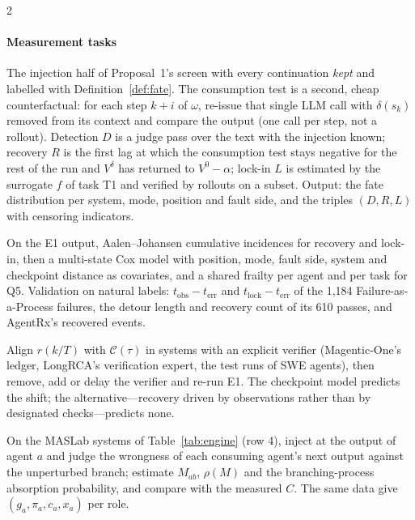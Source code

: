 \begin{multicols}{2}
\paragraph{Measurement tasks}
\begin{description}[leftmargin=1.4em,style=nextline,itemsep=1pt]
\item[E1 --- Fate screen.] The injection half of Proposal~1's screen with every continuation \emph{kept} and labelled with Definition~\ref{def:fate}. The consumption test is a second, cheap counterfactual: for each step $k{+}i$ of $\omega$, re-issue that single LLM call with $\delta(s_k)$ removed from its context and compare the output (one call per step, not a rollout). Detection $D$ is a judge pass over the text with the injection known; recovery $R$ is the first lag at which the consumption test stays negative for the rest of the run and $V^\delta$ has returned to $V^0-\alpha$; lock-in $L$ is estimated by the surrogate $f$ of task T1 and verified by rollouts on a subset. Output: the fate distribution per system, mode, position and fault side, and the triples $(D,R,L)$ with censoring indicators.
\item[E2 --- Lifetime curves.] On the E1 output, Aalen--Johansen cumulative incidences \cite{aalen1978empirical} for recovery and lock-in, then a multi-state Cox model \cite{andersen1982cox,putter2007multistate} with position, mode, fault side, system and checkpoint distance as covariates, and a shared frailty per agent and per task \cite{vaupel1979frailty} for Q5. Validation on natural labels: $t_{\mathrm{obs}}-t_{\mathrm{err}}$ and $t_{\mathrm{lock}}-t_{\mathrm{err}}$ of the 1,184 Failure-as-a-Process failures, the detour length and recovery count of its 610 passes, and AgentRx's recovered events.
\item[E3 --- Checkpoint ablation.] Align $r(k/T)$ with $\mathcal{C}(\tau)$ in systems with an explicit verifier (Magentic-One's ledger, LongRCA's verification expert, the test runs of SWE agents), then remove, add or delay the verifier and re-run E1. The checkpoint model predicts the shift; the alternative---recovery driven by observations rather than by designated checks---predicts none.
\item[E4 --- Propagation matrix.] On the MASLab systems of Table~\ref{tab:engine} (row 4), inject at the output of agent $a$ and judge the wrongness of each consuming agent's next output against the unperturbed branch; estimate $M_{ab}$, $\rho(M)$ and the branching-process absorption probability, and compare with the measured $C$. The same data give $(g_a,\pi_a,c_a,x_a)$ per role.

\end{description}
\end{multicols}

